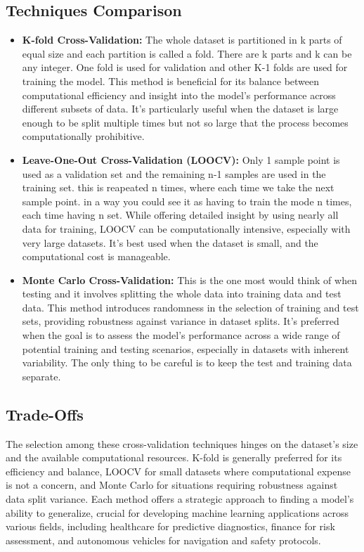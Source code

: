 \documentclass[11pt, a4paper]{article}
\begin{document}
\subsection{Techniques Comparison}
\begin{itemize}
\item \textbf{K-fold Cross-Validation:} The whole dataset is partitioned in k parts of equal size and each partition is called a fold. There are k parts and k can be any integer. One fold is used for validation and other K-1 folds are used for training the model. This method is beneficial for its balance between computational efficiency and insight into the model's performance across different subsets of data. It's particularly useful when the dataset is large enough to be split multiple times but not so large that the process becomes computationally prohibitive.
\item \textbf{Leave-One-Out Cross-Validation (LOOCV):} Only 1 sample point is used as a validation set and the remaining n-1 samples are used in the training set. this is reapeated n times, where each time we take the next sample point. in a way you could see it as having to train the mode n times, each time having n set. While offering detailed insight by using nearly all data for training, LOOCV can be computationally intensive, especially with very large datasets. It's best used when the dataset is small, and the computational cost is manageable.
\item \textbf{Monte Carlo Cross-Validation:} This is the one most would think of when testing and it involves splitting the whole data into training data and test data. This method introduces randomness in the selection of training and test sets, providing robustness against variance in dataset splits. It's preferred when the goal is to assess the model's performance across a wide range of potential training and testing scenarios, especially in datasets with inherent variability. The only thing to be careful is to keep the test and training data separate.
\end{itemize}

\subsection{Trade-Offs}
The selection among these cross-validation techniques hinges on the dataset's size and the available computational resources. K-fold is generally preferred for its efficiency and balance, LOOCV for small datasets where computational expense is not a concern, and Monte Carlo for situations requiring robustness against data split variance. Each method offers a strategic approach to finding a model's ability to generalize, crucial for developing machine learning applications across various fields, including healthcare for predictive diagnostics, finance for risk assessment, and autonomous vehicles for navigation and safety protocols.
\end{document}
